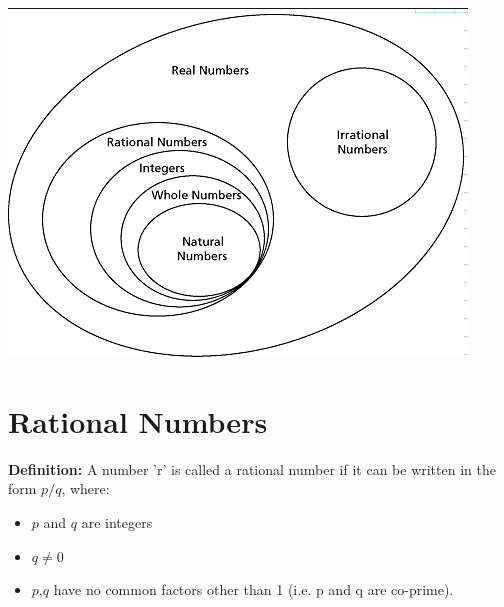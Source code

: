 \documentclass{book}
\begin{document}
	\includegraphics[scale=0.7]{numbersystem}
	
	\section{Rational Numbers}
	\textbf{Definition: }A number 'r' is called a rational number if it can be written in the form $p/q$, where:
	\begin{itemize}
	\item 	$p$ and $q$ are integers 
	\item $q \neq 0$
	\item $p$,$q$ have no common factors other than 1 (i.e. p and q are co-prime).
	\end{itemize}
	
\end{document}

